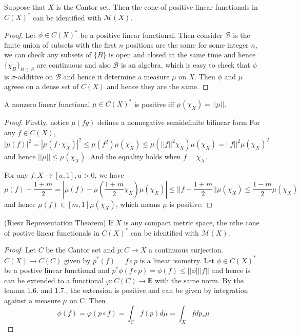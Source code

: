 \documentclass[lang=en, color=blue, ]{elegantbook}
\newcommand{\R}{\mathbb{R}}
\newcommand{\M}{\mathcal{M}}
\begin{document}
\begin{lemma}
Suppose that $X$ is the Cantor set. Then the cone of positive linear functionals in $C(X)^*$ can be identified with $\M(X)$.    
\end{lemma}
\begin{proof}\par
Let $\phi \in C(X)^*$ be a positive linear functional. Then consider $\mathcal{B}$ is the finite union of subsets with the first $n$ positions are the same for some integer $n$, we can check any subsets of $\{B\}$ is open and closed at the same time and hence $\{\chi_{B}\}_{B\in\mathcal{B}}$ are continuous and also $\mathcal{B}$ is an algebra, which is easy to check that $\phi$ is $\sigma$-additive on $\mathcal{B}$ and hence it determine a measure $\mu$ on $X$. Then $\phi$ and $\mu$ agreee on a dense set of $C(X)$ and hence they are the same.     
\end{proof}

\begin{lemma}
A nonzero linear functional $\mu \in C(X)^*$ is positive iff $\mu(\chi_X) = ||\mu||$.    
\end{lemma}
\begin{proof}\par
Firstly, notice $\mu(fg)$ defines a nonnegative semidefinite bilinear form 
For any $f\in C(X)$,
\[|\mu(f)|^2 = |\mu(f\cdot \chi_X)|^2 \leq \mu(f^2)\mu(\chi_X) \leq \mu(||f||^2 \chi_X)\mu(\chi_X) = ||f||^2\mu(\chi_X)^2\]
and hence $||\mu|| \leq \mu(\chi_X)$. And the equality holds when $f = \chi_X$.\par
For any $f:X\to [a,1],a>0$, we have
\[\mu(f)-\dfrac{1+m}{2} = |\mu(f)-\mu(\dfrac{1+m}{2}\chi_X)\mu(\chi_X)|\leq ||f-\dfrac{1+m}{2}||\mu(\chi_X) \leq \dfrac{1-m}{2}\mu(\chi_X)\]
and hence $\mu(f) \in [m,1]\mu(\chi_X) $, which means $\mu$ is positive.
\end{proof}

\begin{theorem}
    (Riesz Representation Theorem) If $X$ is any compact metric space, the nthe cone of postive linear functionals in $C(X)^*$ can be identified with $\M(X)$.
\end{theorem}
\begin{proof}\par
    Let $C$ be the Cantor set and $p:C\to X$ a continuous surjection. $C(X)\to C(C)$ given by $p^*(f) = f\circ p$ is a linear isometry. Let $\phi \in C(X)^*$ be a postive linear functional and $p^*\phi(f\circ p) = \phi(f) \leq ||\phi|||f||$ and hence is can be extended to a functional $\varphi: C(C)\to \R$ with the same norm. By the lemma 1.6. and 1.7., the extension is positive and can be given by integration against a measure $\mu$ on C. Then
    \[\phi(f) = \varphi(p\circ f) = \int_C f(p)d\mu = \int_X fdp_*\mu\]
\end{proof}
\end{document}
